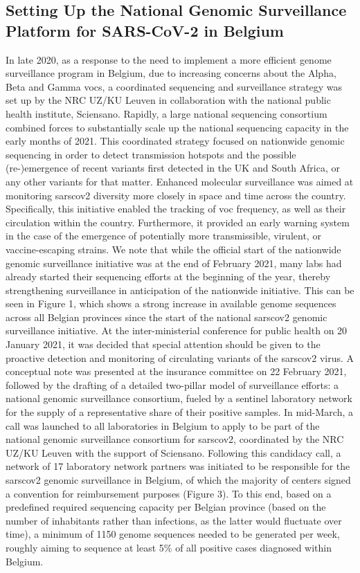 \subsection{Setting Up the National Genomic Surveillance Platform for SARS-CoV-2 in Belgium}
In late 2020, as a response to the need to implement a more efficient genome surveillance program in Belgium, due to increasing concerns about the Alpha, Beta and Gamma \gls{voc}s, a coordinated sequencing and surveillance strategy was set up by the NRC UZ/KU Leuven in collaboration with the national public health institute, Sciensano.
Rapidly, a large national sequencing consortium combined forces to substantially scale up the national sequencing capacity in the early months of 2021.
This coordinated strategy focused on nationwide genomic sequencing in order to detect transmission hotspots and the possible (re-)emergence of recent variants first detected in the UK and South Africa, or any other variants for that matter.
Enhanced molecular surveillance was aimed at monitoring \gls{sarscov2} diversity more closely in space and time across the country.
Specifically, this initiative enabled the tracking of \gls{voc} frequency, as well as their circulation within the country.
Furthermore, it provided an early warning system in the case of the emergence of potentially more transmissible, virulent, or vaccine-escaping strains.
We note that while the official start of the nationwide genomic surveillance initiative was at the end of February 2021, many labs had already started their sequencing efforts at the beginning of the year, thereby strengthening surveillance in anticipation of the nationwide initiative.
This can be seen in Figure 1, which shows a strong increase in available genome sequences across all Belgian provinces since the start of the national \gls{sarscov2} genomic surveillance initiative.
At the inter-ministerial conference for public health on 20 January 2021, it was decided that special attention should be given to the proactive detection and monitoring of circulating variants of the \gls{sarscov2} virus.
A conceptual note was presented at the insurance committee on 22 February 2021, followed by the drafting of a detailed two-pillar model of surveillance efforts: a national genomic surveillance consortium, fueled by a sentinel laboratory network for the supply of a representative share of their positive samples.
In mid-March, a call was launched to all laboratories in Belgium to apply to be part of the national genomic surveillance consortium for \gls{sarscov2}, coordinated by the NRC UZ/KU Leuven with the support of Sciensano.
Following this candidacy call, a network of 17 laboratory network partners was initiated to be responsible for the \gls{sarscov2} genomic surveillance in Belgium, of which the majority of centers signed a convention for reimbursement purposes (Figure 3).
To this end, based on a predefined required sequencing capacity per Belgian province (based on the number of inhabitants rather than infections, as the latter would fluctuate over time), a minimum of 1150 genome sequences needed to be generated per week, roughly aiming to sequence at least 5\% of all positive cases diagnosed within Belgium.


